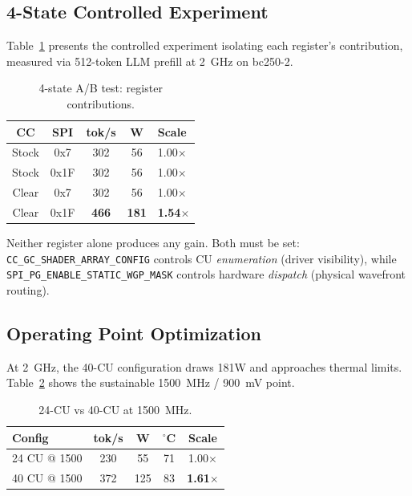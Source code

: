 \documentclass[11pt,twocolumn]{article}
\begin{document}
\subsection{4-State Controlled Experiment}

Table~\ref{tab:4state} presents the controlled experiment isolating each register's contribution, measured via 512-token LLM prefill at 2~GHz on bc250-2.

\begin{table}[H]
\centering
\caption{4-state A/B test: register contributions.}
\label{tab:4state}
\small
\begin{tabular}{@{}ccccl@{}}
\toprule
\textbf{CC} & \textbf{SPI} & \textbf{tok/s} & \textbf{W} & \textbf{Scale} \\
\midrule
Stock & 0x7 & 302 & 56 & 1.00$\times$ \\
Stock & 0x1F & 302 & 56 & 1.00$\times$ \\
Clear & 0x7 & 302 & 56 & 1.00$\times$ \\
Clear & 0x1F & \textbf{466} & \textbf{181} & \textbf{1.54$\times$} \\
\bottomrule
\end{tabular}
\end{table}

Neither register alone produces any gain. Both must be set: \texttt{CC\_GC\_SHADER\_ARRAY\_CONFIG} controls CU \textit{enumeration} (driver visibility), while \texttt{SPI\_PG\_ENABLE\_STATIC\_WGP\_MASK} controls hardware \textit{dispatch} (physical wavefront routing).

\subsection{Operating Point Optimization}

At 2~GHz, the 40-CU configuration draws 181W and approaches thermal limits. Table~\ref{tab:oppoint} shows the sustainable 1500~MHz / 900~mV point.

\begin{table}[H]
\centering
\caption{24-CU vs 40-CU at 1500~MHz.}
\label{tab:oppoint}
\small
\begin{tabular}{@{}lcccc@{}}
\toprule
\textbf{Config} & \textbf{tok/s} & \textbf{W} & \textbf{$^\circ$C} & \textbf{Scale} \\
\midrule
24 CU @ 1500 & 230 & 55 & 71 & 1.00$\times$ \\
40 CU @ 1500 & 372 & 125 & 83 & \textbf{1.61$\times$} \\
\bottomrule
\end{tabular}
\end{table}
\end{document}
